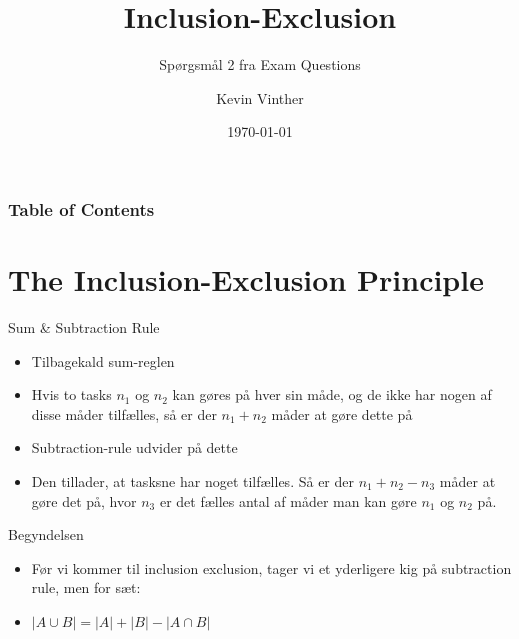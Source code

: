 \documentclass{beamer}
\title{Inclusion-Exclusion}
\subtitle{Spørgsmål 2 fra Exam Questions}
\author{Kevin Vinther}
\date{\today}
\begin{document}
\begin{frame}
    \titlepage
\end{frame}

\begin{frame}[allowframebreaks]
    \frametitle{Table of Contents}
    \tableofcontents
\end{frame}

\section{The Inclusion-Exclusion Principle}

\begin{frame}{Sum \& Subtraction Rule}
   \begin{itemize}
       \item Tilbagekald sum-reglen
       \item Hvis to tasks $n_1$ og $n_2$ kan gøres på hver sin måde, og de ikke har nogen af disse måder tilfælles, så er der $n_1 + n_2$ måder at gøre dette på
       \item Subtraction-rule udvider på dette
       \item Den tillader, at tasksne har noget tilfælles. Så er der $n_1 + n_2 - n_3$ måder at gøre det på, hvor $n_3$ er det fælles antal af måder man kan gøre $n_1$ og $n_2$ på.
   \end{itemize} 
\end{frame}

\begin{frame}{Begyndelsen}
   \begin{itemize}
       \item Før vi kommer til inclusion exclusion, tager vi et yderligere kig på subtraction rule, men for sæt:
       \item $|A \cup B| = |A| + |B| - |A \cap B|$
   \end{itemize} 
\end{frame}
\end{document}
